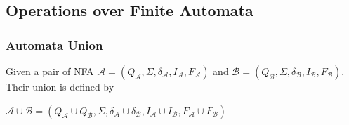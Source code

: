   \subsection{Operations over Finite Automata}
    \subsubsection{Automata Union}
    \label{defAUnion}
      Given a pair of NFA $\mathcal{A}=(Q_\mathcal{A},\Sigma,\delta_\mathcal{A},I_\mathcal{A},F_\mathcal{A})$ 
      and $\mathcal{B}=(Q_\mathcal{B},\Sigma,\delta_\mathcal{B},I_\mathcal{B},F_\mathcal{B})$. Their union is defined by
      \begin{description}
        \item $\mathcal{A} \cup \mathcal{B}=(Q_\mathcal{A}\cup Q_\mathcal{B},\Sigma,
            \delta_\mathcal{A}\cup\delta_\mathcal{B},I_\mathcal{A}\cup I_\mathcal{B},F_\mathcal{A}\cup F_\mathcal{B})$
      \end{description}
    

